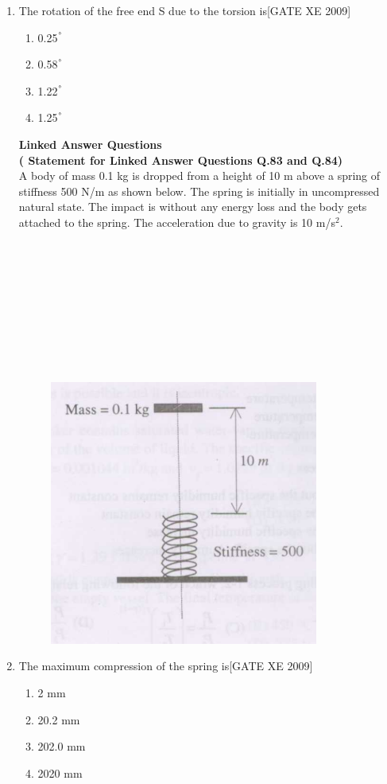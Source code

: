 \documentclass[journal,12pt,onecolumn]{IEEEtran}
\theoremstyle{remark}
\begin{document}
\begin{enumerate}
\item The rotation of the free end S due to the torsion is\hfill[GATE XE 2009]
\begin{multicols}{2}
\begin{enumerate}
    \item 0.25$^\degree$
    \item 0.58$^\degree$
    \item 1.22$^\degree$
    \item 1.25$^\degree$
\end{enumerate}
\end{multicols}





\Large\textbf{ Linked Answer Questions}\\
 \textbf{( Statement for Linked Answer Questions Q.83 and Q.84)}  \\

A body of mass 0.1 kg is dropped from a height of 10 m above a spring of stiffness 500 N/m as shown below. The spring is initially in uncompressed natural state. The impact is without any energy loss and the body gets attached to the spring. The acceleration due to gravity is 10 m/s$^2$.\\\\\\\\\\\\\\\\\\\

\begin{figure}[H]
    \centering
    \includegraphics[width=0.5\linewidth]{figs/fig26.png}
    \caption*{}
    \label{fig:Q 83 84}
\end{figure}

\item The maximum compression of the spring is\hfill[GATE XE 2009]
\begin{multicols}{2}
\begin{enumerate}
    \item 2 mm
    \item 20.2 mm
    \item 202.0 mm
    \item 2020 mm
\end{enumerate}
\end{multicols}


\end{enumerate}
\end{document}
